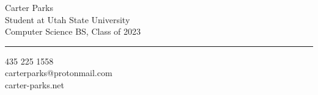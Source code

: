 \documentclass[12pt]{article}
\begin{document}
\sffamily

\begin{multicols}{2}
{ \Huge Carter Parks}\\

{\color{mainGray}
Student at Utah State University\\
Computer Science BS, Class of 2023
}
\vspace{14pt}
{\color{hrulegray}\hrule
}

\columnbreak

\begin{flushright}
{\small {}
435\,\textbullet\,225\,\textbullet\,1558\\
carterparks@protonmail.com\\
carter-parks.net\\
}
\end{flushright}

\end{multicols}
\end{document}
